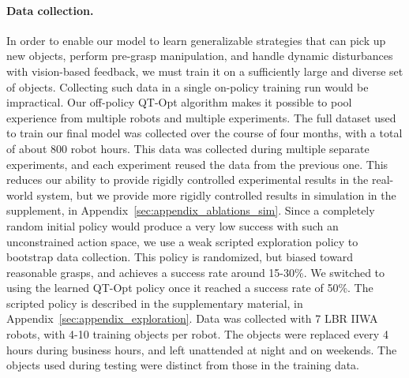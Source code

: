 \documentclass{article}
\begin{document}
\vspace{-0.1in}
\paragraph{Data collection.}
In order to enable our model to learn generalizable strategies that can pick up new objects, perform pre-grasp manipulation, and handle dynamic disturbances with vision-based feedback, we must train it on a sufficiently large and diverse set of objects. Collecting such data in a single on-policy training run would be impractical. Our off-policy QT-Opt algorithm makes it possible to pool experience from multiple robots and multiple experiments. The full dataset used to train our final model was collected over the course of four months, with a total of about 800 robot hours. This data was collected during multiple separate experiments, and each experiment reused the data from the previous one. This reduces our ability to provide rigidly controlled experimental results in the real-world system, but we provide more rigidly controlled results in simulation in the supplement, in Appendix~\ref{sec:appendix_ablations_sim}.
Since a completely random initial policy would produce a very low success with such an unconstrained action space, we use a weak scripted exploration policy to bootstrap data collection. This policy is randomized, but biased toward reasonable grasps, and achieves a success rate around 15-30\%. We switched to using the learned QT-Opt policy once it reached a success rate of 50\%. The scripted policy is described in the supplementary material, in Appendix~\ref{sec:appendix_exploration}. 
Data was collected with 7 LBR IIWA robots, with 4-10 training objects per robot. The objects were replaced every 4 hours during business hours, and left unattended at night and on weekends. The objects used during testing were distinct from those in the training data.

\iffalse

\begin{algorithm}[h]{\small
	\caption{Large scale data collection and training on real robots}
	\label{alg:servo}
	\begin{algorithmic}[1]
		\STATE Allocate persistent dataset \(D_{e2e}=\emptyset\).
	    \FOR{$i < num\_experiments$}
		\STATE Keep replaying data from \(D_{e2e}\) to the \(off\_policy\) Replay Buffer.
		\STATE Keep training the model concurrently utilizing distributed RL infrastructure and data pulled from \(on\_policy\) and \(off\_policy\) Replay Buffers.
		\FOR{$j < num\_grasps\_per\_experiment$}
            \STATE Pick \(p_{scripted}\) with probability \(p\) or \(p_{noisy}\) with probability \(1-p\) to generate an episode \(E\).
            \STATE Push episode \(E\) to the \(on\_policy\) Replay Buffer.
            \STATE Append episode \(E\) to \(D_{e2e}\) and save to disk.
            \STATE Update \(p_{noisy}\) model every \(N\) steps.
        \ENDFOR
		\ENDFOR
	\end{algorithmic}
}
\end{algorithm}
\fi
\end{document}
